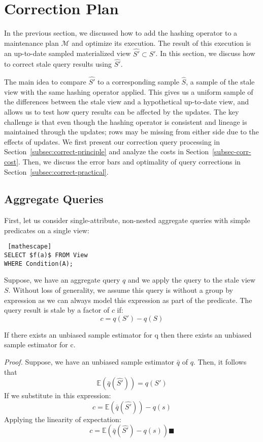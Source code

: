 \section{Correction Plan}
\label{correction}
In the previous section, we discussed how to add the hashing operator to a maintenance plan $\mathcal{M}$ and optimize its execution.
The result of this execution is an up-to-date sampled materialized view $\hat{S'} \subset S'$.
In this section, we discuss how to correct stale query results using $\hat{S'}$. 

The main idea to compare $\hat{S'}$ to a corresponding sample $\hat{S}$, a sample of the stale view with the same hashing operator applied.
This gives us a uniform sample of the differences between the stale view and a hypothetical up-to-date view, and allows us to test how query results can be affected by the updates.
The key challenge is that even though the hashing operator is consistent and lineage is maintained through the updates; rows may be missing from either side due to the effects of updates.
We first present our correction query processing in Section~\ref{subsec:correct-principle} and analyze the costs in Section~\ref{subsec-corr-cost}. Then, we discuss the error bars and optimality of query corrections in Section~\ref{subsec:correct-practical}.

\subsection{ Aggregate Queries}
First, let us consider single-attribute, non-nested aggregate queries with simple predicates on a single view:
\begin{lstlisting} [mathescape]
SELECT $f(a)$ FROM View 
WHERE Condition(A);
\end{lstlisting}

Suppose, we have an aggregate query $q$ and we apply the query to the stale view $S$.
Without loss of generality, we assume this query is without a group by expression as we can always model this expression as part of the predicate.
The query result is stale by a factor of $c$ if:
\[ c = q(S') - q(S)\] 
\begin{lemma}
If there exists an unbiased sample estimator for q then there exists an unbiased sample estimator for c.
\end{lemma}

\emph{Proof.} Suppose, we have an unbiased sample estimator $\bar{q}$ of $q$. 
Then, it follows that \[\mathbb{E}(\bar{q}(\hat{S'})) = q(S')\]
If we substitute in this expression:
\[ c = \mathbb{E}(\bar{q}(\hat{S'})) -q(s) \] 
Applying the linearity of expectation:
\[ c = \mathbb{E}(\bar{q}(\hat{S'}) - q(s)) \blacksquare \]

